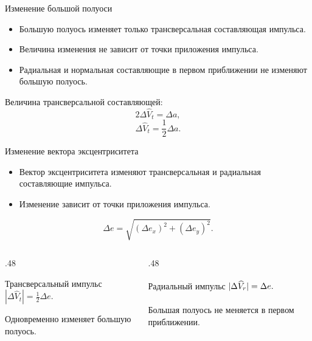 \documentclass[11pt,aspectratio=169,t]{beamer}
\begin{document}
\begin{frame}{Изменение большой полуоси}
\relax
\begin{itemize}
 \setlength{\itemsep}{7pt}
 \item Большую полуось изменяет только трансверсальная составляющая импульса.
 \item Величина изменения не зависит от точки приложения импульса.
 \item Радиальная и нормальная составляющие в первом приближении не изменяют большую полуось.
\end{itemize}
\medskip
Величина трансверсальной составляющей:
\[
 2\Delta\widehat V_t=\Delta a,
\]
\[
 \boxed{\Delta\widehat V_t=\frac12\Delta a.}
\]
\end{frame}

\begin{frame}{Изменение вектора эксцентриситета}
\relax
\begin{itemize}
 \setlength{\itemsep}{5pt}
 \item Вектор эксцентриситета изменяют трансверсальная и радиальная составляющие импульса.
 \item Изменение зависит от точки приложения импульса.
\end{itemize}
\[
 \Delta e=\sqrt{(\Delta e_x)^2+(\Delta e_y)^2}.
\]
\begin{columns}[T,onlytextwidth]
\begin{column}{.48\textwidth}
\begin{block}{Трансверсальный импульс}
\centering $\displaystyle |\Delta\widehat V_t|=\frac12\Delta e.$\par\smallskip
\RaggedRight
Одновременно изменяет большую полуось.
\end{block}
\end{column}
\begin{column}{.48\textwidth}
\begin{block}{Радиальный импульс}
\centering $\displaystyle \vphantom{\frac12}|\Delta\widehat V_r|=\Delta e.$\par\smallskip
\RaggedRight
Большая полуось не меняется в первом приближении.
\end{block}
\end{column}
\end{columns}
\end{frame}
\end{document}

